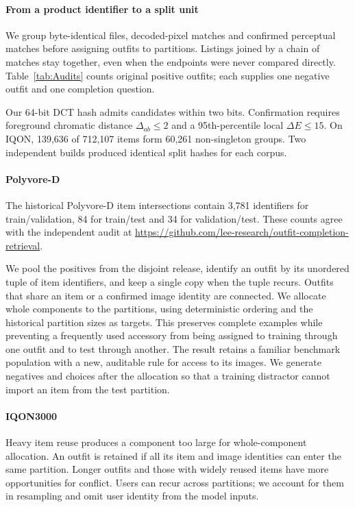 \showAudits

\paragraph{From a product identifier to a split unit}
We group byte-identical files, decoded-pixel matches and confirmed perceptual matches before assigning outfits to partitions. Listings joined by a chain of matches stay together, even when the endpoints were never compared directly. Table~\ref{tab:Audits} counts original positive outfits; each supplies one negative outfit and one completion question.

Our 64-bit DCT hash admits candidates within two bits. Confirmation requires foreground chromatic distance $\Delta_{ab}\leq2$ and a 95th-percentile local $\Delta E\leq15$. On IQON, 139,636 of 712,107 items form 60,261 non-singleton groups. Two independent builds produced identical split hashes for each corpus.

\paragraph{Polyvore-D}
The historical Polyvore-D item intersections contain 3,781 identifiers for train/validation, 84 for train/test and 34 for validation/test. These counts agree with the independent audit at \url{https://github.com/lee-research/outfit-completion-retrieval}.

We pool the positives from the disjoint release, identify an outfit by its unordered tuple of item identifiers, and keep a single copy when the tuple recurs. Outfits that share an item or a confirmed image identity are connected. We allocate whole components to the partitions, using deterministic ordering and the historical partition sizes as targets. This preserves complete examples while preventing a frequently used accessory from being assigned to training through one outfit and to test through another. The result retains a familiar benchmark population with a new, auditable rule for access to its images. We generate negatives and choices after the allocation so that a training distractor cannot import an item from the test partition.

\paragraph{IQON3000}
Heavy item reuse produces a component too large for whole-component allocation. An outfit is retained if all its item and image identities can enter the same partition. Longer outfits and those with widely reused items have more opportunities for conflict. Users can recur across partitions; we account for them in resampling and omit user identity from the model inputs.

